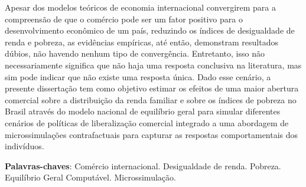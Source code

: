 

\begin{resumo}
	\SingleSpacing
	
	Apesar dos modelos teóricos de economia internacional convergirem para a compreensão de que o comércio pode ser um fator positivo para o desenvolvimento econômico de um país, reduzindo os índices de desigualdade de renda e pobreza, as evidências empíricas, até então, demonstram resultados dúbios, não havendo nenhum tipo de convergência. Entretanto, isso não necessariamente significa que não haja uma resposta conclusiva na literatura, mas sim pode indicar que não existe uma resposta única. Dado esse cenário, a presente dissertação tem como objetivo estimar os efeitos de uma maior abertura comercial sobre a distribuição da renda familiar e sobre os índices de pobreza no Brasil através do modelo nacional de equilíbrio geral para simular diferentes cenários de políticas de liberalização comercial integrado a uma abordagem de microssimulações contrafactuais para capturar as respostas comportamentais dos indivíduos. 
	
	\noindent 
	\textbf{Palavras-chaves}: Comércio internacional. Desigualdade de renda. Pobreza. Equilíbrio Geral Computável. Microssimulação.
\end{resumo}



